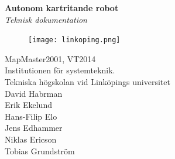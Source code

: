 \documentclass[a4paper,12pt,fleqn]{article}
\begin{document}
	\pagestyle{fancy}
	\thispagestyle{empty}
	\vspace*{\fill}
		\begingroup
			\begin{center}
				\huge{\textbf{Autonom kartritande robot}} 
				\\
				\vspace{15pt}
				\large{\emph{Teknisk dokumentation}}
				\normalsize
				\\
				\vspace{55pt}
				\begin{figure}[htp]
					\begin{center}
				  	  \texttt{[image: linkoping.png]}  %
					\end{center}
				\end{figure}
				\vspace{40pt}
				MapMaster2001, VT2014
				\\
				Institutionen för systemteknik.
				\\
				Tekniska högskolan vid Linköpings universitet
				\\
				\vspace{20 pt}
				David Habrman \\
				Erik Ekelund \\
				Hans-Filip Elo \\
				Jens Edhammer \\
				Niklas Ericson \\
				Tobias Grundström \\
			\end{center}
		\endgroup
	\vspace*{\fill}
\end{document}
